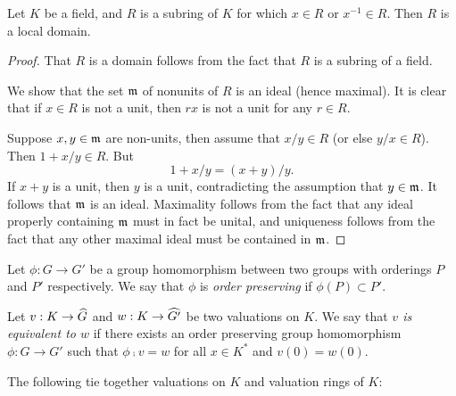 \begin{prop}\label{prop_val_rng_are_local}
Let $K$ be a field, and $R$ is a subring of $K$ for which $x \in 
R$ or $x^{-1} \in R$. Then $R$ is a local domain.
\end{prop}
\begin{proof}
That $R$ is a domain follows from the fact that $R$ is a subring of
a field.

We show that the set $\mathfrak{m}$ of nonunits of $R$ is an ideal 
(hence maximal). It is clear that if $x \in R$ is not a unit, then
$rx$ is not a unit for any $r \in R$.

Suppose $x, y \in \mathfrak{m}$ are non-units, then assume \WLOG that 
$x/y \in R$ (or else $y/x \in R$). Then $1 + x/y \in R$. But
\[
1 + x/y = (x + y)/y.
\]
If $x + y$ is a unit, then $y$ is a unit, contradicting the 
assumption that $y \in \mathfrak{m}$. It follows that $\mathfrak{m}$
is an ideal. Maximality follows from the fact that any ideal
properly containing $\mathfrak{m}$ must in fact be unital, and 
uniqueness follows from the fact that any other maximal ideal must
be contained in $\mathfrak{m}$.
\end{proof}

\begin{defn}
Let $\phi: G \to G'$ be a group homomorphism between two groups 
with orderings $P$ and $P'$ respectively. We say that $\phi$ is
\emph{order preserving} if $\phi(P) \subset P'$.

Let $v: K \to \widehat{G}$ and $w: K \to \widehat{G'}$ be two valuations 
on $K$. We say that \emph{$v$ is equivalent to $w$} if there
exists an order preserving group homomorphism $\phi: G \to G'$
such that $\phi \comp v = w$ for all $x \in K^*$ and $v(0) = 
w(0)$.
\end{defn}

The following tie together valuations on $K$ and valuation rings
of $K$:

